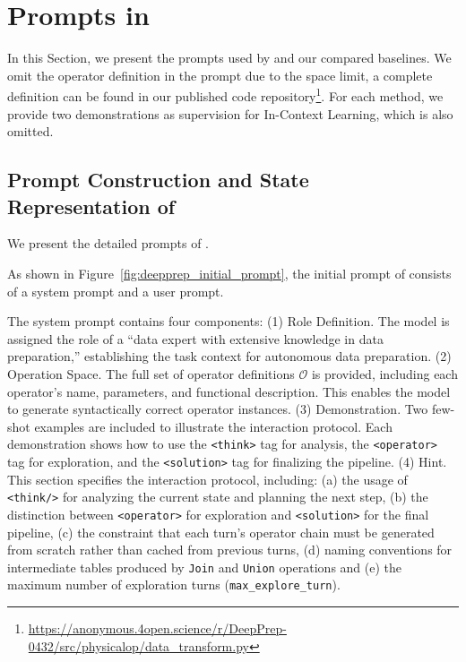 \section{Prompts in \sys}
\label{appendix:prompts_in_autoprep}

In this Section, we present the prompts used by \sys and our compared baselines. We omit the operator definition in the prompt due to the space limit, a complete definition can be found in our published code repository\footnote{\url{https://anonymous.4open.science/r/DeepPrep-0432/src/physicalop/data_transform.py}}. For each method, we provide two demonstrations as supervision for In-Context Learning, which is also omitted.

\subsection{Prompt Construction and State Representation of \sys}
\label{subsec:appendix_deepprep_prompt}

We present the detailed prompts of \sys.




As shown in Figure~\ref{fig:deepprep_initial_prompt}, the initial prompt of \sys consists of a system prompt and a user prompt.

The system prompt contains four components:
(1) {Role Definition}. The model is assigned the role of a ``data expert with extensive knowledge in data preparation,'' establishing the task context for autonomous data preparation.
(2) {Operation Space}. The full set of operator definitions $\mathcal{O}$ is provided, including each operator's name, parameters, and functional description. This enables the model to generate syntactically correct operator instances.
(3) {Demonstration}. Two few-shot examples are included to illustrate the interaction protocol. Each demonstration shows how to use the \texttt{<think>} tag for analysis, the \texttt{<operator>} tag for exploration, and the \texttt{<solution>} tag for finalizing the pipeline.
(4) {Hint}. This section specifies the interaction protocol, including: (a) the usage of \texttt{<think/>} for analyzing the current state and planning the next step, (b) the distinction between \texttt{<operator>} for exploration and \texttt{<solution>} for the final pipeline, (c) the constraint that each turn's operator chain must be generated from scratch rather than cached from previous turns, (d) naming conventions for intermediate tables produced by \texttt{Join} and \texttt{Union} operations and (e) the maximum number of exploration turns (\texttt{max\_explore\_turn}).

